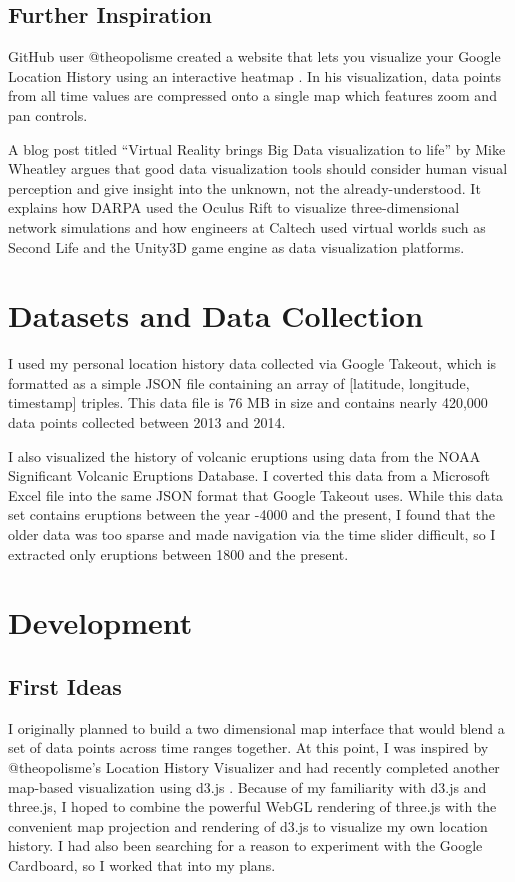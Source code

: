 \documentclass[conference]{acmsiggraph}
\begin{document}
\subsection{Further Inspiration}

GitHub user @theopolisme created a website that lets you visualize your Google
Location History using an interactive heatmap
\cite{location-history-visualizer}. In his visualization, data points from all
time values are compressed onto a single map which features zoom and pan
controls.

A blog post titled ``Virtual Reality brings Big Data visualization to life''
by Mike Wheatley \cite{VR:BigData} argues that good data visualization tools
should consider human visual perception and give insight into the unknown, not
the already-understood. It explains how DARPA used the Oculus Rift to visualize
three-dimensional network simulations and how engineers at Caltech used virtual
worlds such as Second Life and the Unity3D game engine as data visualization
platforms.


\section{Datasets and Data Collection}

I used my personal location history data collected via Google Takeout, which is
formatted as a simple JSON file containing an array of [latitude, longitude,
timestamp] triples. This data file is 76 MB in size and contains nearly 420,000
data points collected between 2013 and 2014.

I also visualized the history of volcanic eruptions using data from the NOAA
Significant Volcanic Eruptions Database. I coverted this data from a Microsoft
Excel file into the same JSON format that Google Takeout uses. While this data
set contains eruptions between the year -4000 and the present, I found that the
older data was too sparse and made navigation via the time slider difficult, so
I extracted only eruptions between 1800 and the present.

\section{Development}

\subsection{First Ideas}

I originally planned to build a two dimensional map interface that would blend
a set of data points across time ranges together. At this point, I was inspired
by @theopolisme's Location History Visualizer and had recently completed another
map-based visualization using d3.js \cite{D3.js}. Because of my familiarity with
d3.js and three.js, I hoped to combine the powerful WebGL rendering of three.js
with the convenient map projection and rendering of d3.js to visualize my own
location history. I had also been searching for a reason to experiment with the
Google Cardboard, so I worked that into my plans.
\end{document}
